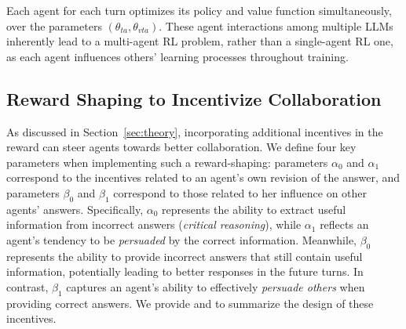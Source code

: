 {Each agent for each turn optimizes its policy and value function simultaneously, over the parameters \((\theta_{ta}, \theta_{vta})\). These agent interactions among multiple LLMs inherently lead to a multi-agent RL problem, rather than a single-agent RL one, as each agent influences others' learning processes throughout training. 

\safevspace{-2mm}

\subsection{Reward {Shaping to Incentivize Collaboration}}
\label{sec:incentive-coll}
As discussed in Section~\ref{sec:theory}, incorporating {additional incentives in the reward}  can steer  agents towards better   collaboration. We define four key parameters when implementing such a reward-shaping: parameters $\alpha_0$ and $\alpha_1$ correspond to the incentives related to an agent's own revision of the answer, {and parameters $\beta_0$ and $\beta_1$ correspond to those related to her influence on other agents' answers.} Specifically, $\alpha_0$ represents the ability to extract useful information from incorrect answers ({\it critical reasoning}), while $\alpha_1$ reflects an agent's tendency to be {\it persuaded} by the correct information. Meanwhile, $\beta_0$ represents the ability to provide incorrect answers that still contain useful information, potentially leading to better responses in the future turns. In contrast, $\beta_1$ captures an agent's ability to effectively {\it persuade others} when providing correct answers. We provide  and  to summarize the design of these incentives. 

}
